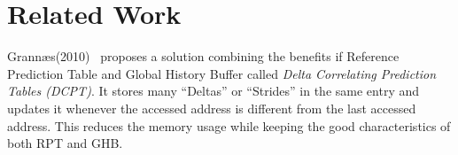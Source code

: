 \section{Related Work} %

Grannæs(2010)~\cite{grannaes2010} proposes a solution combining the benefits if
Reference Prediction Table and Global History Buffer called \textit{Delta
Correlating Prediction Tables (DCPT)}. It stores many ``Deltas'' or ``Strides''
in the same entry and updates it whenever the accessed address is different from
the last accessed address. This reduces the memory usage while keeping the good
characteristics of both RPT and GHB.

